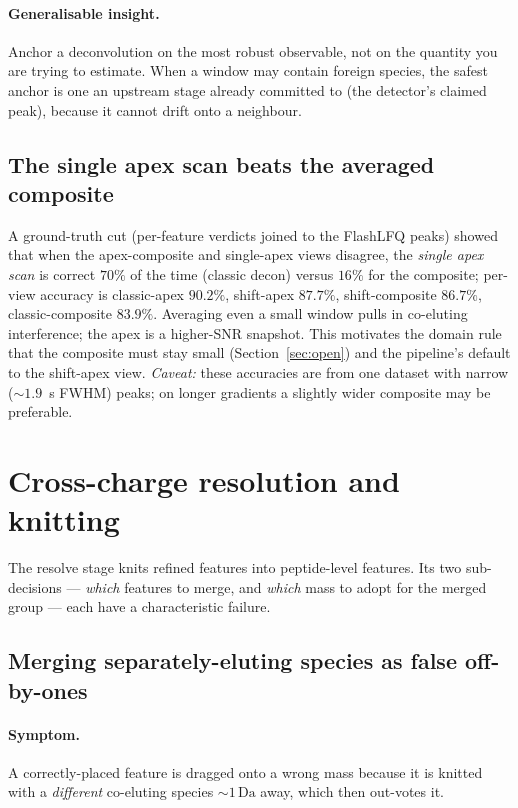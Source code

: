 \documentclass[11pt]{article}
\newcommand{\Da}{\,\text{Da}}
\begin{document}
\paragraph{Generalisable insight.} Anchor a deconvolution on the most robust observable, not on
the quantity you are trying to estimate. When a window may contain foreign species, the safest
anchor is one an upstream stage already committed to (the detector's claimed peak), because it
cannot drift onto a neighbour.

\subsection{The single apex scan beats the averaged composite}
\label{sec:apex}
A ground-truth cut (per-feature verdicts joined to the FlashLFQ peaks) showed that when the
apex-composite and single-apex views disagree, the \emph{single apex scan} is correct $70\%$ of the
time (classic decon) versus $16\%$ for the composite; per-view accuracy is classic-apex $90.2\%$,
shift-apex $87.7\%$, shift-composite $86.7\%$, classic-composite $83.9\%$. Averaging even a small
window pulls in co-eluting interference; the apex is a higher-SNR snapshot. This motivates the
domain rule that the composite must stay small (Section~\ref{sec:open}) and the pipeline's default
to the shift-apex view. \emph{Caveat:} these accuracies are from one dataset with narrow ($\sim1.9$~s
FWHM) peaks; on longer gradients a slightly wider composite may be preferable.

\section{Cross-charge resolution and knitting}
\label{sec:resolve}

The resolve stage knits refined features into peptide-level features. Its two sub-decisions ---
\emph{which} features to merge, and \emph{which} mass to adopt for the merged group --- each have a
characteristic failure.

\subsection{Merging separately-eluting species as false off-by-ones}
\label{sec:knit}

\paragraph{Symptom.} A correctly-placed feature is dragged onto a wrong mass because it is knitted
with a \emph{different} co-eluting species $\sim 1\Da$ away, which then out-votes it.
\end{document}
